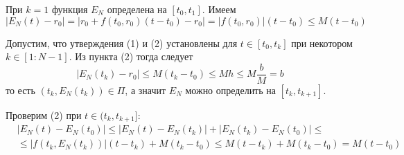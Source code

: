 При $k = 1$ функция $E_N$ определена на $[t_0, t_1]$. Имеем
\begin{equation*}
    |E_N(t) - r_0| = |r_0 + f(t_0, r_0)(t - t_0) - r_0| = |f(t_0, r_0)|(t - t_0) \le M(t - t_0)
\end{equation*}
\begin{figure}[h!]\label{peano}
\end{figure}

Допустим, что утверждения (1) и (2) установлены для $t \in [t_0, t_k]$ при некотором $k \in [1 : N - 1]$. Из пункта (2) тогда следует
\begin{equation*}
    |E_N(t_k) - r_0| \le M(t_k - t_0) \le Mh \le M \frac{b}{M} = b
\end{equation*}
то есть $(t_k, E_N(t_k)) \in \Pi$, а значит $E_N$ можно определить на $[t_k, t_{k+1}]$.

Проверим (2) при $t \in (t_k, t_{k+1}]$:
\begin{equation*}
    \begin{aligned}
        &|E_N(t) - E_N(t_0)| \le |E_N(t) - E_N(t_k)| + |E_N(t_k) - E_N(t_0)| \le\\
        &\le |f(t_k, E_N(t_k))|(t-t_k) + M(t_k - t_0) \le M(t - t_k) + M(t_k - t_0) = M(t - t_0)
    \end{aligned}
\end{equation*}
